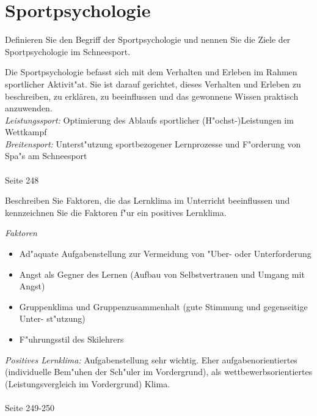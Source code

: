 \section{Sportpsychologie}

\begin{question}{3}
Definieren Sie den Begriff der Sportpsychologie und nennen Sie die Ziele der Sportpsychologie im Schneesport.
\end{question}
\begin{solution}
Die Sportpsychologie befasst sich mit dem Verhalten und Erleben im Rahmen sportlicher Aktivit"at. Sie ist darauf gerichtet, dieses Verhalten und Erleben zu beschreiben, zu erklären, zu beeinflussen und das gewonnene Wissen praktisch anzuwenden.\\
\emph{Leistungssport:} Optimierung des Ablaufs sportlicher (H"ochst-)Leistungen im Wettkampf\\
\emph{Breitensport:} Unterst"utzung sportbezogener Lernprozesse und F"orderung von Spa"s am Schneesport\\\\
 Seite 248
\end{solution}

\begin{question}{4}
Beschreiben Sie Faktoren, die das Lernklima im Unterricht beeinflussen und kennzeichnen Sie die Faktoren f"ur ein positives Lernklima.
\end{question}
\begin{solution}
\emph{Faktoren}
\begin{itemize}
\item Ad"aquate Aufgabenstellung zur Vermeidung von "Uber- oder Unterforderung
\item Angst als Gegner des Lernen (Aufbau von Selbstvertrauen und Umgang mit Angst)
\item Gruppenklima und Gruppenzusammenhalt (gute Stimmung und gegenseitige Unter-
st"utzung)
\item F"uhrungsstil des Skilehrers
\end{itemize}
\emph{Positives Lernklima:} Aufgabenstellung sehr wichtig. Eher aufgabenorientiertes (individuelle Bem"uhen der Sch"uler im Vordergrund), als wettbewerbsorientiertes (Leistungsvergleich im Vordergrund) Klima.\\\\
 Seite 249-250
\end{solution}

